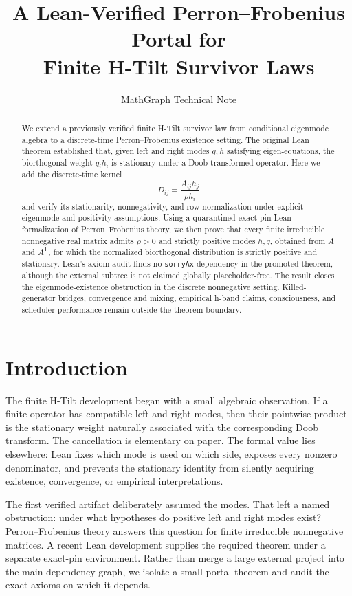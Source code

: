 \documentclass[11pt]{article}
\title{A Lean-Verified Perron--Frobenius Portal for\\Finite H-Tilt Survivor Laws}
\author{MathGraph Technical Note}
\date{}
\begin{document}
\maketitle

\begin{abstract}
We extend a previously verified finite H-Tilt survivor law from conditional
eigenmode algebra to a discrete-time Perron--Frobenius existence setting. The
original Lean theorem established that, given left and right modes \(q,h\)
satisfying eigen-equations, the biorthogonal weight \(q_i h_i\) is stationary
under a Doob-transformed operator. Here we add the discrete-time kernel
\[
  D_{ij}=\frac{A_{ij}h_j}{\rho h_i}
\]
and verify its stationarity, nonnegativity, and row normalization under
explicit eigenmode and positivity assumptions. Using a quarantined exact-pin
Lean formalization of Perron--Frobenius theory, we then prove that every finite
irreducible nonnegative real matrix admits \(\rho>0\) and strictly positive
modes \(h,q\), obtained from \(A\) and \(A^\mathsf{T}\), for which the
normalized biorthogonal distribution is strictly positive and stationary.
Lean's axiom audit finds no \texttt{sorryAx} dependency in the promoted
theorem, although the external subtree is not claimed globally
placeholder-free. The result closes the eigenmode-existence obstruction in the
discrete nonnegative setting. Killed-generator bridges, convergence and mixing,
empirical h-band claims, consciousness, and scheduler performance remain
outside the theorem boundary.
\end{abstract}

\section{Introduction}

The finite H-Tilt development began with a small algebraic observation. If a
finite operator has compatible left and right modes, then their pointwise
product is the stationary weight naturally associated with the corresponding
Doob transform. The cancellation is elementary on paper. The formal value lies
elsewhere: Lean fixes which mode is used on which side, exposes every nonzero
denominator, and prevents the stationary identity from silently acquiring
existence, convergence, or empirical interpretations.

The first verified artifact deliberately assumed the modes. That left a named
obstruction: under what hypotheses do positive left and right modes exist?
Perron--Frobenius theory answers this question for finite irreducible
nonnegative matrices. A recent Lean development supplies the required theorem
under a separate exact-pin environment. Rather than merge a large external
project into the main dependency graph, we isolate a small portal theorem and
audit the exact axioms on which it depends.
\end{document}
